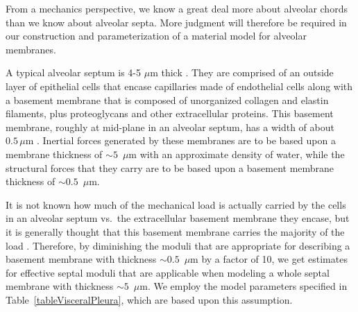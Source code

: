 From a mechanics perspective, we know a great deal more about alveolar chords than we know about alveolar septa.  More judgment will therefore be required in our construction and parameterization of a material model for alveolar membranes.  

A typical alveolar septum is 4-5 $\mu$m thick \cite{Sukietal11}.  They are comprised of an outside layer of epithelial cells that encase capillaries made of endothelial cells along with a basement membrane that is composed of unorganized collagen and elastin filaments, plus proteoglycans and other extracellular proteins.  This basement membrane, roughly at mid-plane in an alveolar septum, has a width of about $0.5 \, \mu$m \cite{RoanWaters11}.  Inertial forces generated by these membranes are to be based upon a membrane thickness of $\sim\!\!5$~$\mu$m with an approximate density of water, while the structural forces that they carry are to be based upon a basement membrane thickness of $\sim\!\! 0.5$~$\mu$m.  

It is not known how much of the mechanical load is actually carried by the cells in an alveolar septum vs.\ the extracellular basement membrane they encase, but it is generally thought that this basement membrane carries the majority of the load \cite{Sukietal11}.  Therefore, by diminishing the moduli that are appropriate for describing a basement membrane with thickness $\sim\!\! 0.5$~$\mu$m by a factor of 10, we get estimates for effective septal moduli that are applicable when modeling a whole septal membrane with thickness $\sim\!\! 5$~$\mu$m.  We employ the model parameters specified in Table~\ref{tableVisceralPleura}, which are based upon this assumption.

